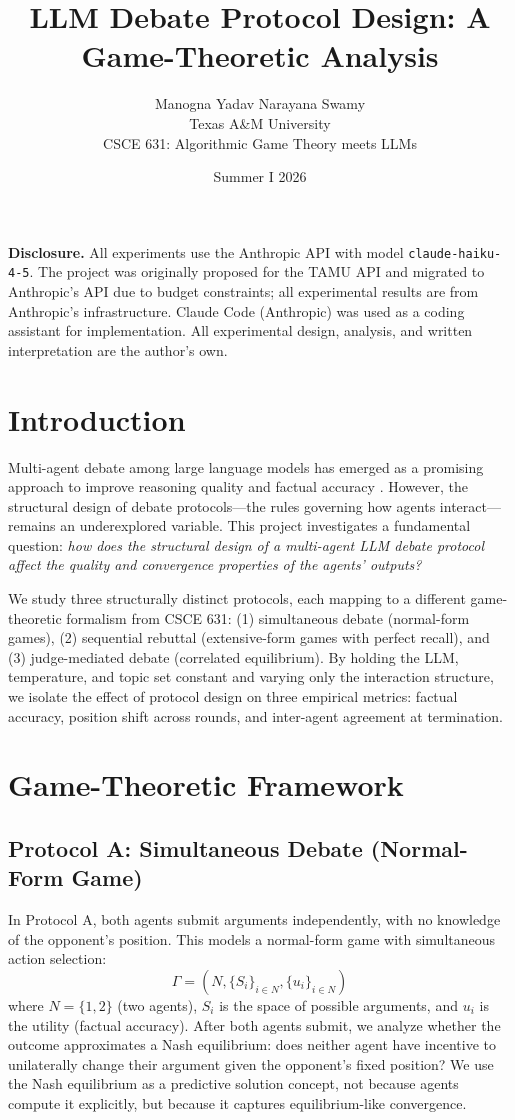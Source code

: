 \documentclass[11pt, oneside]{article}
\title{\textbf{LLM Debate Protocol Design: A Game-Theoretic Analysis}}
\author{Manogna Yadav Narayana Swamy \\ Texas A\&M University \\ CSCE 631: Algorithmic Game Theory meets LLMs}
\date{Summer I 2026}
\begin{document}
\maketitle

\noindent\textbf{Disclosure.} All experiments use the Anthropic API with model \texttt{claude-haiku-4-5}. The project was originally proposed for the TAMU API and migrated to Anthropic's API due to budget constraints; all experimental results are from Anthropic's infrastructure. Claude Code (Anthropic) was used as a coding assistant for implementation. All experimental design, analysis, and written interpretation are the author's own.

\section{Introduction}

Multi-agent debate among large language models has emerged as a promising approach to improve reasoning quality and factual accuracy \cite{irving2018}. However, the structural design of debate protocols---the rules governing how agents interact---remains an underexplored variable. This project investigates a fundamental question: \textit{how does the structural design of a multi-agent LLM debate protocol affect the quality and convergence properties of the agents' outputs?}

We study three structurally distinct protocols, each mapping to a different game-theoretic formalism from CSCE 631: (1) simultaneous debate (normal-form games), (2) sequential rebuttal (extensive-form games with perfect recall), and (3) judge-mediated debate (correlated equilibrium). By holding the LLM, temperature, and topic set constant and varying only the interaction structure, we isolate the effect of protocol design on three empirical metrics: factual accuracy, position shift across rounds, and inter-agent agreement at termination.

\section{Game-Theoretic Framework}

\subsection{Protocol A: Simultaneous Debate (Normal-Form Game)}

In Protocol A, both agents submit arguments independently, with no knowledge of the opponent's position. This models a normal-form game with simultaneous action selection:
\[
\Gamma = (N, \{S_i\}_{i \in N}, \{u_i\}_{i \in N})
\]
where $N = \{1, 2\}$ (two agents), $S_i$ is the space of possible arguments, and $u_i$ is the utility (factual accuracy). After both agents submit, we analyze whether the outcome approximates a Nash equilibrium: does neither agent have incentive to unilaterally change their argument given the opponent's fixed position? We use the Nash equilibrium as a predictive solution concept, not because agents compute it explicitly, but because it captures equilibrium-like convergence.
\end{document}
